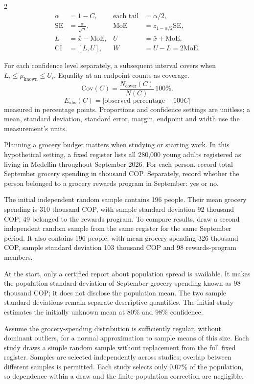 \begin{multicols}{2}
\[
\begin{aligned}
\alpha&=1-C, &\text{each tail}&=\alpha/2,\\
\mathrm{SE}&=\frac{\sigma}{\sqrt n}, &\mathrm{MoE}&=z_{1-\alpha/2}\mathrm{SE},\\
L&=\bar x-\mathrm{MoE}, &U&=\bar x+\mathrm{MoE},\\
\mathrm{CI}&=[L,U], &W&=U-L=2\mathrm{MoE}.
\end{aligned}
\]

For each confidence level separately, a subsequent interval covers when
$L_i\leq\mu_{\mathrm{known}}\leq U_i$. Equality at an endpoint counts as coverage.
\[
\mathrm{Cov}(C)=\frac{N_{\mathrm{cover}}(C)}{N(C)}\,100\%.
\]
\[
E_{\mathrm{abs}}(C)=|\text{observed percentage}-100C|
\]
measured in percentage points.
Proportions and confidence settings are unitless; a mean, standard deviation, standard error, margin, endpoint and width use the measurement's units.

\endgroup

\columnbreak
\begingroup\small
{}

Planning a grocery budget matters when studying or starting work. In this hypothetical setting, a fixed register lists all 280,000 young adults registered as living in Medellin throughout September 2026. For each person, record total September grocery spending in thousand COP. Separately, record whether the person belonged to a grocery rewards program in September: yes or no.

The initial independent random sample contains 196 people. Their mean grocery spending is 310 thousand COP, with sample standard deviation 92 thousand COP; 49 belonged to the rewards program. To compare results, draw a second independent random sample from the same register for the same September period. It also contains 196 people, with mean grocery spending 326 thousand COP, sample standard deviation 103 thousand COP and 98 rewards-program members.

At the start, only a certified report about population spread is available. It makes the population standard deviation of September grocery spending known as 98 thousand COP; it does not disclose the population mean. The two sample standard deviations remain separate descriptive quantities. The initial study estimates the initially unknown mean at 80\% and 98\% confidence.

Assume the grocery-spending distribution is sufficiently regular, without dominant outliers, for a normal approximation to sample means of this size. Each study draws a simple random sample without replacement from the full fixed register. Samples are selected independently across studies; overlap between different samples is permitted. Each study selects only 0.07\% of the population, so dependence within a draw and the finite-population correction are negligible.


\end{multicols}
